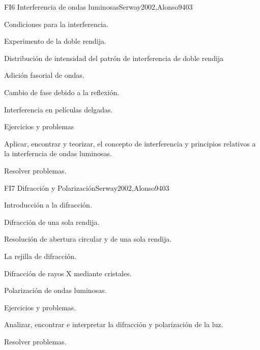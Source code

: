 \begin{syllabus}
\begin{unit}{FI6 Interferencia de ondas luminosas}{Serway2002,Alonso94}{0}{3}
\begin{topics}
      \item Condiciones para la interferencia.
        \item Experimento de la doble rendija.
        \item Distribución de intensidad del patrón
              de interferencia de doble rendija
        \item Adición fasorial de ondas.
        \item Cambio de fase debido a la reflexión.
        \item Interferencia en películas delgadas.
        \item Ejercicios y problemas
   \end{topics}
   \begin{learningoutcomes}
      \item Aplicar, encontrar y teorizar, el concepto de interferencia y
            principios relativos a la interferncia de ondas luminosas.
      \item Resolver problemas.
   \end{learningoutcomes}
\end{unit}

\begin{unit}{FI7 Difracción y Polarización}{Serway2002,Alonso94}{0}{3}
\begin{topics}
      \item Introducción a la difracción.
      \item Difracción de una sola rendija.
      \item Resolución de abertura circular y de una sola rendija.
      \item La rejilla de difracción.
      \item Difracción de rayos X mediante cristales.
      \item Polarización de ondas luminosas.
      \item Ejercicios y problemas.
   \end{topics}

   \begin{learningoutcomes}
      \item Analizar, encontrar e interpretar la difracción y polarización de la luz.
      \item Resolver problemas.
   \end{learningoutcomes}
\end{unit}



\begin{coursebibliography}
\end{coursebibliography}

\end{syllabus}
